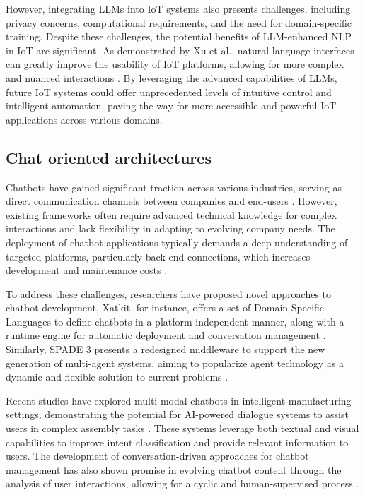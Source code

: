 \documentclass{ieeeaccess}
\begin{document}
However, integrating LLMs into IoT systems also presents challenges, including privacy concerns, computational requirements, and the need for domain-specific training. Despite these challenges, the potential benefits of LLM-enhanced NLP in IoT are significant. As demonstrated by Xu et al., natural language interfaces can greatly improve the usability of IoT platforms, allowing for more complex and nuanced interactions \cite{9808139}. By leveraging the advanced capabilities of LLMs, future IoT systems could offer unprecedented levels of intuitive control and intelligent automation, paving the way for more accessible and powerful IoT applications across various domains.

\subsection{Chat oriented architectures}

Chatbots have gained significant traction across various industries, serving as direct communication channels between companies and end-users \cite{8960373}. However, existing frameworks often require advanced technical knowledge for complex interactions and lack flexibility in adapting to evolving company needs. The deployment of chatbot applications typically demands a deep understanding of targeted platforms, particularly back-end connections, which increases development and maintenance costs \cite{8960373}.

To address these challenges, researchers have proposed novel approaches to chatbot development. Xatkit, for instance, offers a set of Domain Specific Languages to define chatbots in a platform-independent manner, along with a runtime engine for automatic deployment and conversation management \cite{8960373}. Similarly, SPADE 3 presents a redesigned middleware to support the new generation of multi-agent systems, aiming to popularize agent technology as a dynamic and flexible solution to current problems \cite{9207929}. 

Recent studies have explored multi-modal chatbots in intelligent manufacturing settings, demonstrating the potential for AI-powered dialogue systems to assist users in complex assembly tasks \cite{9440470}. These systems leverage both textual and visual capabilities to improve intent classification and provide relevant information to users. The development of conversation-driven approaches for chatbot management has also shown promise in evolving chatbot content through the analysis of user interactions, allowing for a cyclic and human-supervised process \cite{9681834}.
\end{document}
